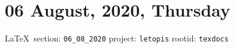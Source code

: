  
 
\section{06 August, 2020, Thursday}
  
\vspace{0.5cm}
 {\ifDEBUG\small\LaTeX~section: \verb|06_08_2020| project: \verb|letopis| rootid: \verb|texdocs|	\fi}
\vspace{0.5cm}

  
